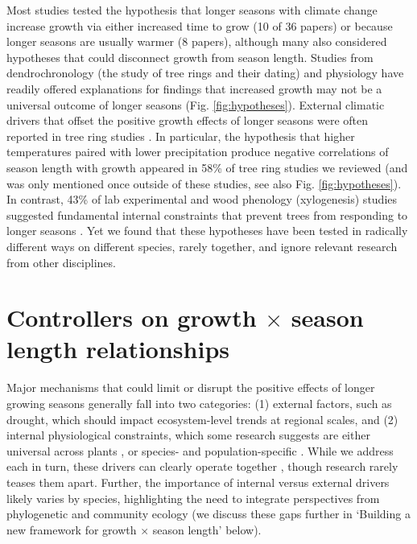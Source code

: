 \documentclass[11pt]{article}
\newcommand{\R}[1]{\label{#1}\linelabel{#1}}
\begin{document}
Most studies tested the hypothesis that longer seasons with climate change increase growth via either increased time to grow (10 of 36 papers) or because longer seasons are usually warmer (8 papers), although many also considered hypotheses that could disconnect growth from season length. Studies from dendrochronology (the study of tree rings and their dating) and physiology have readily offered explanations for findings that increased growth may not be a universal outcome of longer seasons (Fig. \ref{fig:hypotheses}). External climatic drivers that offset the positive growth effects of longer seasons were often reported in tree ring studies \citep{kolavr2016response,de2022temperature,camarero2022decoupled}. In particular, the hypothesis that higher temperatures paired with lower precipitation produce negative correlations of season length with growth appeared in 58\% of tree ring studies we reviewed (and was only mentioned once outside of these studies, see also Fig. \ref{fig:hypotheses}). In contrast, 43\% of lab experimental and wood phenology (xylogenesis) studies suggested fundamental internal constraints that prevent trees from responding to longer seasons \citep[Fig. \ref{fig:heatmapssupp},][]{cuny2012life,michelot2012comparing,zohner2023effect}. Yet we found that these hypotheses have been tested in radically different ways on different species, rarely together, and ignore relevant research from other disciplines. %
 
\section*{Controllers on growth $\times$ season length relationships} %

Major mechanisms that could limit or disrupt the positive effects of longer growing seasons generally fall into two categories: (1) external factors, such as drought, which should impact ecosystem-level trends at regional scales, and (2) internal physiological constraints, which some research suggests are either universal across plants \citep[e.g.][]{zohner2023effect}, or species- and population-specific \citep[e.g.][]{soolanayakanahally2013timing}. While we address each in turn, these drivers can clearly operate together \citep[][]{korner2015paradigm}\R{forbigKinteract1}, though research rarely teases them apart. Further, the importance of internal versus external drivers likely varies by species, highlighting the need to integrate perspectives from  phylogenetic and community ecology (we discuss these gaps further in `Building a new framework for growth $\times$ season length' below). 
\end{document}

